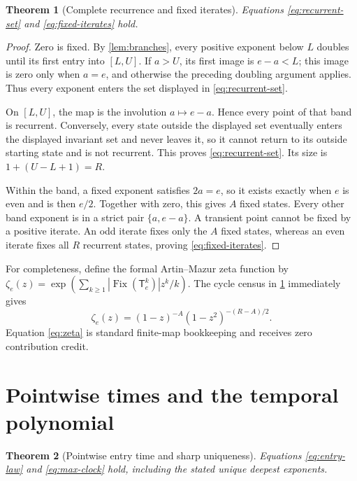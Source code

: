 \documentclass[10pt,a4paper]{amsart}
\newtheorem{theorem}{Theorem}[section]
\theoremstyle{definition}
\theoremstyle{remark}
\newcommand{\T}{\mathsf T}
\newcommand{\Fix}{\operatorname{Fix}}
\begin{document}
\begin{theorem}[Complete recurrence and fixed iterates]\label{thm:recurrence}
Equations \eqref{eq:recurrent-set} and \eqref{eq:fixed-iterates} hold.
\end{theorem}

\begin{proof}
Zero is fixed.  By \cref{lem:branches}, every positive exponent below $L$
doubles until its first entry into $[L,U]$.  If $a>U$, its first image is
$e-a<L$; this image is zero only when $a=e$, and otherwise the preceding
doubling argument applies.  Thus every exponent enters the set displayed in
\eqref{eq:recurrent-set}.

On $[L,U]$, the map is the involution $a\mapsto e-a$.  Hence every point of
that band is recurrent.  Conversely, every state outside the displayed set
eventually enters the displayed invariant set and never leaves it, so it
cannot return to its outside starting state and is not recurrent.  This proves
\eqref{eq:recurrent-set}.  Its size is
$1+(U-L+1)=R$.

Within the band, a fixed exponent satisfies $2a=e$, so it exists exactly
when $e$ is even and is then $e/2$.  Together with zero, this gives $A$
fixed states.  Every other band exponent is in a strict pair
$\{a,e-a\}$.  A transient point cannot be fixed by a positive iterate.  An
odd iterate fixes only the $A$ fixed states, whereas an even iterate fixes all
$R$ recurrent states, proving \eqref{eq:fixed-iterates}.
\end{proof}

For completeness, define the formal Artin--Mazur zeta function by
$\zeta_e(z)=\exp(\sum_{k\geq1}|\Fix(\T_e^k)|z^k/k)$.  The cycle census in
\cref{thm:recurrence} immediately gives
\begin{equation}\label{eq:zeta}
 \zeta_e(z)=(1-z)^{-A}(1-z^2)^{-(R-A)/2}.
\end{equation}
Equation \eqref{eq:zeta} is standard finite-map bookkeeping and receives zero
contribution credit.

\section{Pointwise times and the temporal polynomial}

\begin{theorem}[Pointwise entry time and sharp uniqueness]\label{thm:entry}
Equations \eqref{eq:entry-law} and \eqref{eq:max-clock} hold, including the
stated unique deepest exponents.
\end{theorem}
\end{document}

